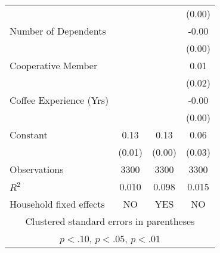 \begin{table}[htbp]
\begin{tabular}{l*{3}{c}}
                &                  &                  &   (0.00)         \\
Number of Dependents&                  &                  &    -0.00\sym{*}  \\
                &                  &                  &   (0.00)         \\
Cooperative Member&                  &                  &     0.01         \\
                &                  &                  &   (0.02)         \\
Coffee Experience (Yrs)&                  &                  &    -0.00\sym{*}  \\
                &                  &                  &   (0.00)         \\
Constant        &     0.13\sym{***}&     0.13\sym{***}&     0.06\sym{*}  \\
                &   (0.01)         &   (0.00)         &   (0.03)         \\
\midrule
Observations    &     3300         &     3300         &     3300         \\
\(R^{2}\)       &    0.010         &    0.098         &    0.015         \\
Household fixed effects&       NO         &      YES         &       NO         \\
\bottomrule
\multicolumn{4}{c}{\footnotesize Clustered standard errors in parentheses}\\
\multicolumn{4}{c}{\footnotesize \sym{*} \(p<.10\), \sym{**} \(p<.05\), \sym{***} \(p<.01\)}\\
\end{tabular}
\end{table}
